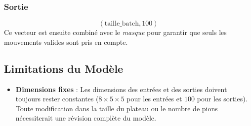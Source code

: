 \documentclass[]{article}
\begin{document}
\subsubsection{Sortie}
\[
(\text{taille\_batch}, 100)
\]
Ce vecteur est ensuite combiné avec le \textit{masque} pour garantir que seuls les mouvements valides sont pris en compte.

\subsection{Limitations du Modèle}
\begin{itemize}
    \item \textbf{Dimensions fixes} : Les dimensions des entrées et des sorties doivent toujours rester constantes (\(8 \times 5 \times 5\) pour les entrées et \(100\) pour les sorties). Toute modification dans la taille du plateau ou le nombre de pions nécessiterait une révision complète du modèle.
\end{itemize}
\end{document}
